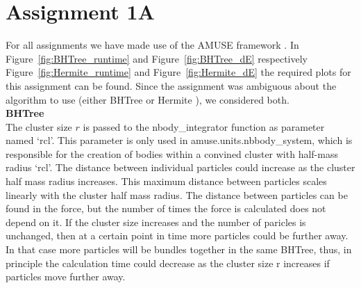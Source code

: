 \documentclass[a4paper]{article}
\begin{document}
\newpage

\section*{Assignment 1A}
For all assignments we have made use of the AMUSE framework \citep{2013CoPhC.183..456P, 2013A&A...557A..84P, 2009NewA...14..369P}. In Figure~\ref{fig:BHTree_runtime} and Figure~\ref{fig:BHTree_dE} respectively Figure~\ref{fig:Hermite_runtime} and Figure~\ref{fig:Hermite_dE} the required plots for this assignment can be found. Since the assignment was ambiguous about the algorithm to use (either BHTree \citep{1986Natur.324..446B} or Hermite \citep{1995ApJ...443L..93H}), we considered both. \\

\noindent \textbf{BHTree} \\
The cluster size $r$ is passed to the nbody\_integrator function as parameter
named `rcl'. This parameter is only used in amuse.units.nbbody\_system, which is
responsible for the creation of bodies within a convined cluster with half-mass
radius `rcl'. The distance between individual particles could increase  as the
cluster half mass radius increases. This maximum distance between particles
scales linearly with the cluster half mass radius. The distance between
particles can be found in the force, but the number of times the force is
calculated does not depend on it. If the cluster size increases and the number
of paricles is unchanged, then at a certain point in time more particles could
be further away. In that case more particles will be bundles together in the
same BHTree, thus, in principle the calculation time could decrease as the
cluster size r increases if particles move further away. 
\end{document}
